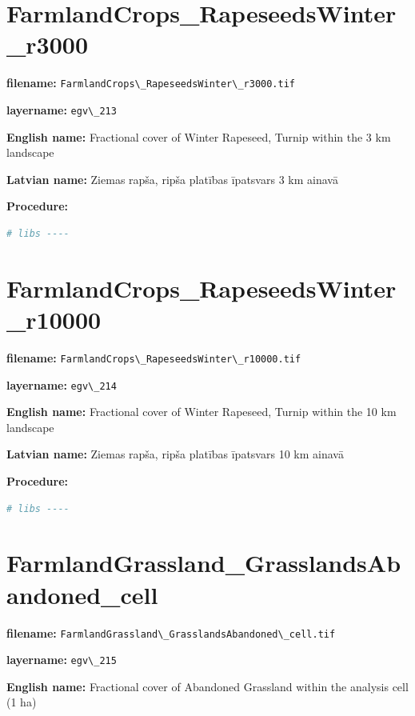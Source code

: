\documentclass[
]{book}
\newcommand{\passthrough}[1]{#1}
\begin{document}
\section{FarmlandCrops\_RapeseedsWinter\_r3000}\label{ch06.213}

\textbf{filename:} \passthrough{\lstinline!FarmlandCrops\_RapeseedsWinter\_r3000.tif!}

\textbf{layername:} \passthrough{\lstinline!egv\_213!}

\textbf{English name:} Fractional cover of Winter Rapeseed, Turnip within the 3 km landscape

\textbf{Latvian name:} Ziemas rapša, ripša platības īpatsvars 3 km ainavā

\textbf{Procedure:}

\begin{lstlisting}[language=R]
# libs ----
\end{lstlisting}

\section{FarmlandCrops\_RapeseedsWinter\_r10000}\label{ch06.214}

\textbf{filename:} \passthrough{\lstinline!FarmlandCrops\_RapeseedsWinter\_r10000.tif!}

\textbf{layername:} \passthrough{\lstinline!egv\_214!}

\textbf{English name:} Fractional cover of Winter Rapeseed, Turnip within the 10 km landscape

\textbf{Latvian name:} Ziemas rapša, ripša platības īpatsvars 10 km ainavā

\textbf{Procedure:}

\begin{lstlisting}[language=R]
# libs ----
\end{lstlisting}

\section{FarmlandGrassland\_GrasslandsAbandoned\_cell}\label{ch06.215}

\textbf{filename:} \passthrough{\lstinline!FarmlandGrassland\_GrasslandsAbandoned\_cell.tif!}

\textbf{layername:} \passthrough{\lstinline!egv\_215!}

\textbf{English name:} Fractional cover of Abandoned Grassland within the analysis cell (1 ha)
\end{document}

